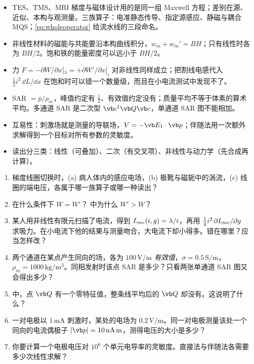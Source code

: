 \begin{takeaways}
\begin{itemize}
\item TES、TMS、MRI 梯度与磁体设计用的是同一组 Maxwell 方程；差别在源、近似、本构与观测量。三族算子：电准静态传导、指定源感应、静磁与耦合 MQS；\eqref{eq:wholeoperator} 给流水线的三段命名。
\item 非线性材料的磁能与共能要沿本构曲线积分，$w_m+w_m'=BH$；只有线性时各为 $BH/2$。饱和铁的能量密度可以远小于 $BH/2$。
\item 力 $F=-\partial W/\partial x|_\lambda=+\partial W'/\partial x|_i$ 对非线性同样成立；把割线电感代入 $\tfrac12i^2\,\dd L/\dd x$ 在饱和时可以错一个数量级，而且在小电流测试中发现不了。
\item SAR $=\overline p/\rho_m$，峰值约定有 $\tfrac12$、有效值约定没有；质量平均不等于体素的算术平均。多通道 SAR 是二次型 $\vb c^\dagger\vb Q\vb c$，单通道 SAR 图不能相加。
\item 互易性：刺激场就是测量的导联场，$V=-\vb E_1\cdot\vb p$；伴随法用一次额外求解得到一个目标对所有参数的灵敏度。
\item 读出分三类：线性（可叠加）、二次（有交叉项）、非线性与动力学（先合成再计算）。
\end{itemize}
\end{takeaways}

\begin{selfcheck}
\begin{enumerate}
\item 梯度线圈切换时，(a) 病人体内的感应电场，(b) 极靴与磁轭中的涡流，(c) 线圈的端电压，各属于哪一族算子或哪一种读出？
\item 在什么条件下 $W=W'$？ 中为什么 $W'>W$？
\item 某人用非线性有限元扫描了电流，得到 $L_{\rm sec}(i,g)=\lambda/i$，再用 $\tfrac12i^2\,\partial L_{\rm sec}/\partial g$ 求吸力。在小电流下他的结果与测量吻合，大电流下却小得多。错在哪里？应当怎样改？
\item 两个通道在某点产生同向的场，各为 $100\,\mathrm{V/m}$ \emph{有效值}，$\sigma=0.5\,\mathrm{S/m}$，$\rho_m=1000\,\mathrm{kg/m^3}$。同相发射时该点 SAR 是多少？只看两张单通道 SAR 图又会得出多少？
\item {} 中，点 $\vb Q$ 有一个零特征值，整条线平均后的 $\vb Q$ 却没有。这说明了什么？
\item 一对电极以 $1\,\mathrm{mA}$ 刺激时，某处的电场为 $0.2\,\mathrm{V/m}$。同一对电极测量该处一个同向的电流偶极子 $|\vb p|=10\,\mathrm{nA\,m}$，测得电压的大小是多少？
\item 你要计算一个电极电压对 $10^6$ 个单元电导率的灵敏度。直接法与伴随法各需要多少次线性求解？
\end{enumerate}
\end{selfcheck}


